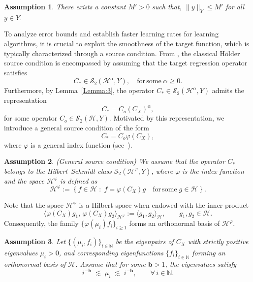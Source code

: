 \documentclass[twoside,11pt]{article}
\newtheorem{assumption}{Assumption}
\begin{document}
\begin{assumption}\label{bound-Y-asssumption}
There exists a constant $M' > 0$ such that,  $\|y\|_Y \le M'$ for all $y \in Y$.

\end{assumption}

{
To analyze error bounds and establish faster learning rates for learning algorithms, it is crucial to exploit the smoothness of the target function, which is typically characterized through a source condition.  
From \cite{meunier2024optimal}, the classical Hölder source condition is encompassed by assuming that the target regression operator satisfies
\[
C_\ast \in \mathcal S_2(\mathcal H^\alpha, Y),
\quad \mathrm{for \, some } \; \alpha \ge 0 .
\]
Furthermore, by Lemma~\ref{Lemma:3}, the operator $C_\ast\in \mathcal S_2(\mathcal H^\alpha, Y)$ admits the representation
\[
C_\ast = C_o (C_X)^\alpha,
\]
for some operator $C_o \in \mathcal S_2(\mathcal H, Y)$.
Motivated by this representation, we introduce a general source condition of the form
\[
C_\ast = C_o \varphi(C_X),
\]
where $\varphi$ is a general index function (see~\cite{Gupta_2025}).
}

\begin{assumption}{(General source condition)}\label{assump:source}
{
We assume that the operator $C_\ast$ belongs to the Hilbert--Schmidt class
$\mathcal S_2(\mathcal H^{\varphi},Y)$, where $\varphi$ is the index function and  the space $\mathcal H^{\varphi}$ is defined as
\[
\mathcal H^{\varphi}
:= \left\{ f \in \mathcal H \;:\; f = \varphi(C_X) g \quad \mathrm{for \, some } \; g \in \mathcal H \right\}.
\]
}
\end{assumption}

\noindent
{
Note that the space $\mathcal H^{\varphi}$ is a Hilbert space when endowed with the inner product
\[
\big\langle \varphi(C_X) g_1,\, \varphi(C_X) g_2 \big\rangle_{\mathcal H^{\varphi}}
:= \langle g_1, g_2 \rangle_{\mathcal H},
\qquad g_1, g_2 \in \mathcal H.
\]
}
{
Consequently, the family $
\{\varphi(\mu_i) f_i\}_{i \ge 1}$
forms an orthonormal basis of $\mathcal H^{\varphi}$.
}



\begin{assumption}\label{eigendecay}
Let $\{(\mu_i,f_i)\}_{i\in\mathbb{N}}$ be the eigenpairs of $C_X$ with strictly positive eigenvalues $\mu_i>0$, and corresponding eigenfunctions $\{f_i\}_{i\in\mathbb{N}}$ forming an orthonormal basis of $\mathcal H$. Assume that for some $\mathbf{b} > 1$, the eigenvalues satisfy
\[
i^{-\mathbf{b}} \;\lesssim\; \mu_i \;\lesssim\; i^{-\mathbf{b}},
\qquad \forall\, i \in \mathbb{N}.
\]
\end{assumption}
\end{document}
